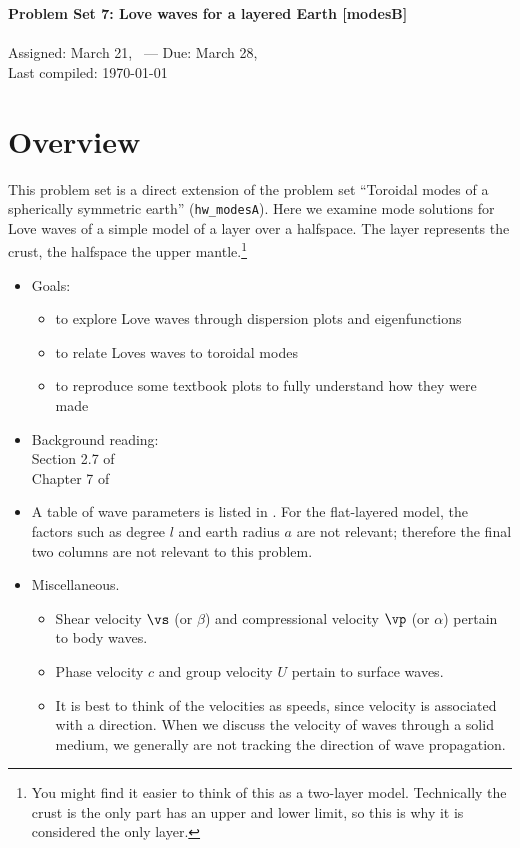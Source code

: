 \documentclass[11pt,titlepage,fleqn]{article}
\begin{document}

\begin{spacing}{1.2}
\centering
{\large \bf Problem Set 7: Love waves for a layered Earth [modesB]} \\
\cltag\ \\
Assigned: March 21, \cyear\ --- Due: March 28, \cyear\ \\
Last compiled: \today
\end{spacing}


\section*{Overview}

This problem set is a direct extension of the problem set ``Toroidal modes of a spherically symmetric earth'' (\verb+hw_modesA+). Here we examine mode solutions for Love waves of a simple model of a layer over a halfspace. The layer represents the crust, the halfspace the upper mantle.\footnote{You might find it easier to think of this as a two-layer model. Technically the crust is the only part has an upper and lower limit, so this is why it is considered the only layer.}

\begin{itemize}
\item Goals:
%
\begin{itemize}
\item to explore Love waves through dispersion plots and eigenfunctions
\item to relate Loves waves to toroidal modes
\item to reproduce some textbook plots to fully understand how they were made
\end{itemize}

\item Background reading: \\
Section 2.7 of \citet{SteinWysession} \\
Chapter 7 of \citet{AkiRichardsE2}

\item A table of wave parameters is listed in . For the flat-layered model, the factors such as degree $l$ and earth radius $a$ are not relevant; therefore the final two columns are not relevant to this problem.

\item Miscellaneous.
\begin{itemize}
\item Shear velocity $\vs$ (or $\beta$) and compressional velocity $\vp$ (or $\alpha$) pertain to body waves.
\item Phase velocity $c$ and group velocity $U$ pertain to surface waves.
\item It is best to think of the velocities as speeds, since velocity is associated with a direction. When we discuss the velocity of waves through a solid medium, we generally are not tracking the direction of wave propagation.
\end{itemize}

\end{itemize}
\end{document}
